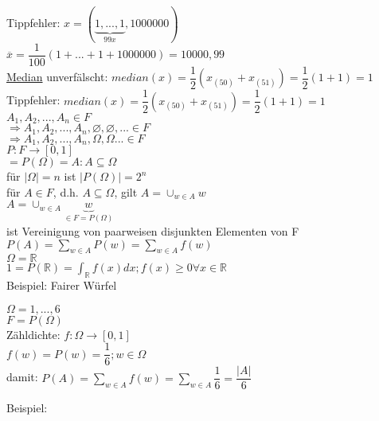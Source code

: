 \documentclass[paper=a4, fontsize=11pt]{scrartcl}
\numberwithin{equation}{section}
\numberwithin{figure}{section}
\numberwithin{table}{section}
\begin{document}
Tippfehler: $x= (\underbrace{1,...,1}_{99x}, 1 000 000)$ \\
$\overline{x}=\dfrac{1}{100} (1+...+1+1 000 000) =10 000,99$ \\

\underline{Median}
unverfälscht: $median(x)=\dfrac{1}{2}(x_{(50)}+x_{(51)}) = \dfrac{1}{2} (1+1)=1$ \\
Tippfehler: $median(x)=\dfrac{1}{2}(x_{(50)}+x_{(51)}) = \dfrac{1}{2} (1+1)=1$ \\

$A_{1},A_{2},...,A_{n} \in F$ \\
$\Rightarrow A_{1},A_{2},...,A_{n}, \varnothing, \varnothing, ... \in F $ \\
$\Rightarrow A_{1},A_{2},...,A_{n}, \Omega , \Omega ... \in F $ \\
 
$P: F \rightarrow [0,1]$  \\
$= P( \Omega) = {A: A \subseteq \Omega}$ \\
für $| \Omega| = n$ ist $|P( \Omega)| = 2^{n}$ \\
für $A \in F$, d.h. $A \subseteq \Omega$, gilt $A = \cup_{w \in A} {w}$ \\
$A= \cup_{w \in A} {\underbrace{w}_{\in F= P( \Omega)}}$ \\
ist Vereinigung von paarweisen disjunkten Elementen von F \\

$P(A)= \sum_{w \in A} P({w}) = \sum_{w \in A}f(w)$ \\
$\Omega = \mathbb{R}$ \\
$1=P(\mathbb{R})= \int_{\mathbb{R}} f(x) dx ; f(x) \geq 0 \forall x \in \mathbb{R}$ \\

Beispiel: Fairer Würfel

$\Omega={1,...,6}$ \\
$F=P( \Omega)$ \\
Zähldichte: $f: \Omega \rightarrow [0,1]$ \\
$f(w) = P({w}) = \dfrac{1}{6}; w \in \Omega$ \\
damit: $P(A)= \sum_{w \in A} f(w) = \sum_{w \in A} \dfrac{1}{6}=\dfrac{|A|}{6}$

Beispiel:
\end{document}
